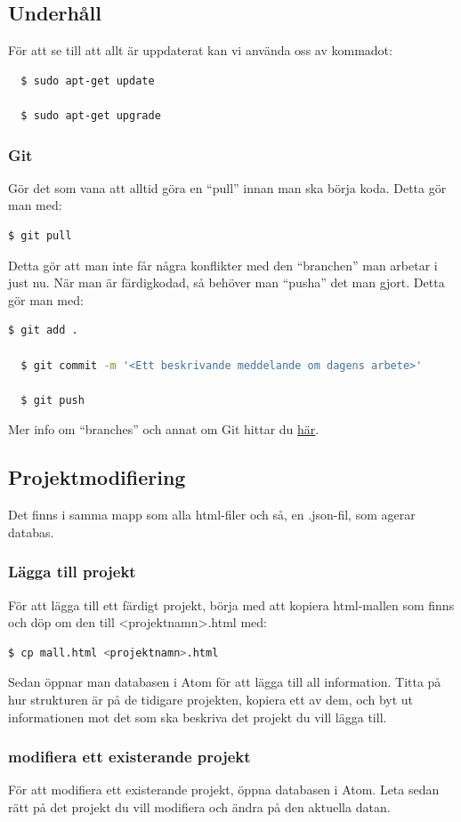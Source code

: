 \documentclass{TDP003mall}
\begin{document}
\subsection{Underhåll}
För att se till att allt är uppdaterat kan vi använda oss av kommadot:
\begin{lstlisting}
  $ sudo apt-get update

  $ sudo apt-get upgrade
\end{lstlisting}

\subsubsection{Git}
Gör det som vana att alltid göra en ``pull'' innan man ska börja koda. Detta gör man
med:
\begin{lstlisting}[language=bash]
  $ git pull
\end{lstlisting}
Detta gör att man inte får några konflikter med den ``branchen'' man arbetar i just nu.
När man är färdigkodad, så behöver man ``pusha'' det man gjort. Detta gör man med:
\begin{lstlisting}[language=bash]
  $ git add .

  $ git commit -m '<Ett beskrivande meddelande om dagens arbete>'

  $ git push
\end{lstlisting}
Mer info om ``branches'' och annat om Git hittar du \href{https://help.github.com/}{här}.
\subsection{Projektmodifiering}
Det finns i samma mapp som alla html-filer och så, en .json-fil, som agerar databas.
\subsubsection{Lägga till projekt}
För att lägga till ett färdigt projekt, börja med att kopiera html-mallen som finns
och döp om den till <projektnamn>.html med:
\begin{lstlisting}[language=bash]
  $ cp mall.html <projektnamn>.html
\end{lstlisting}
Sedan öppnar man databasen i Atom för att lägga till all information. Titta på
hur strukturen är på de tidigare projekten, kopiera ett av dem, och byt ut
informationen mot det som ska beskriva det projekt du vill lägga till.

\subsubsection{modifiera ett existerande projekt}
För att modifiera ett existerande projekt, öppna databasen i Atom. Leta sedan rätt
på det projekt du vill modifiera och ändra på den aktuella datan.
\end{document}
